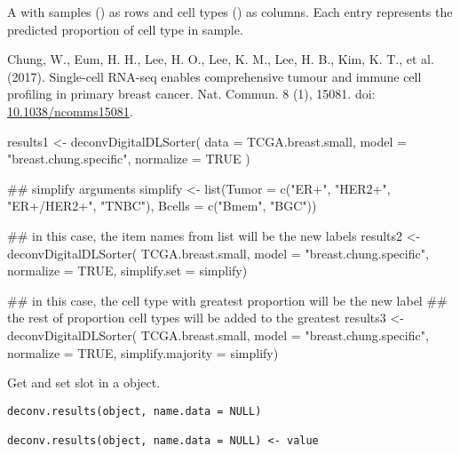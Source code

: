 \documentclass[a4paper]{book}
\begin{document}
%
\begin{Value}
A  with samples () as rows and cell types
() as columns. Each entry represents the predicted proportion of
 cell type in  sample.
\end{Value}
%
\begin{References}\relax
Chung, W., Eum, H. H., Lee, H. O., Lee, K. M., Lee, H. B., Kim,
K. T., et al. (2017). Single-cell RNA-seq enables comprehensive tumour and
immune cell profiling in primary breast cancer. Nat. Commun. 8 (1), 15081.
doi: \url{10.1038/ncomms15081}.
\end{References}
%
\begin{SeeAlso}\relax
{}
\end{SeeAlso}
%
\begin{Examples}
\begin{ExampleCode}
results1 <- deconvDigitalDLSorter(
  data = TCGA.breast.small,
  model = "breast.chung.specific",
  normalize = TRUE
)

## simplify arguments
simplify <- list(Tumor = c("ER+", "HER2+", "ER+/HER2+", "TNBC"),
                 Bcells = c("Bmem", "BGC"))

## in this case,  the item names from list will be the new labels
results2 <- deconvDigitalDLSorter(
  TCGA.breast.small,
  model = "breast.chung.specific",
  normalize = TRUE,
  simplify.set = simplify)

## in this case, the cell type with greatest proportion will be the new label
## the rest of proportion cell types will be added to the greatest
results3 <- deconvDigitalDLSorter(
  TCGA.breast.small,
  model = "breast.chung.specific",
  normalize = TRUE,
  simplify.majority = simplify)

\end{ExampleCode}
\end{Examples}
%
\begin{Description}\relax
Get and set  slot in a 
object.
\end{Description}
%
\begin{Usage}
\begin{verbatim}
deconv.results(object, name.data = NULL)

deconv.results(object, name.data = NULL) <- value
\end{verbatim}
\end{Usage}
\end{document}
